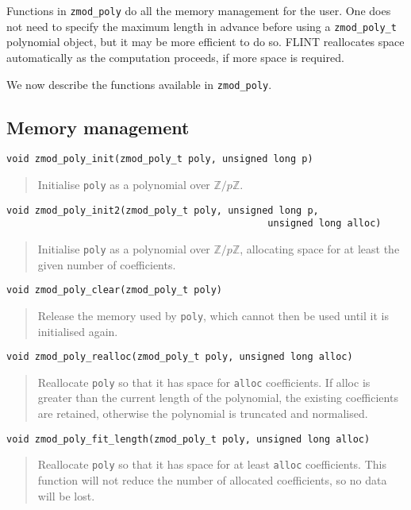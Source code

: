 \documentclass[a4paper,10pt]{article}
\newcommand{\Z}{\mathbb{Z}}
\newcommand{\code}{\lstinline}
\begin{document}
Functions in \code{zmod_poly} do all the memory management for the user. One does not need to specify the maximum length in advance before using a \code{zmod_poly_t} polynomial object, but it may be more efficient to do so. FLINT reallocates space automatically as the computation proceeds, if more space is required. 

We now describe the functions available in \code{zmod_poly}.

\subsection{Memory management}

\begin{lstlisting}
void zmod_poly_init(zmod_poly_t poly, unsigned long p)
\end{lstlisting}
\begin{quote}
Initialise \code{poly} as a polynomial over $\Z/p\Z$. 
\end{quote}

\begin{lstlisting}
void zmod_poly_init2(zmod_poly_t poly, unsigned long p, 
                                              unsigned long alloc)
\end{lstlisting}
\begin{quote}
Initialise \code{poly} as a polynomial over $\Z/p\Z$, allocating space for at least the given number of coefficients. 
\end{quote}

\begin{lstlisting}
void zmod_poly_clear(zmod_poly_t poly)
\end{lstlisting}
\begin{quote}
Release the memory used by \code{poly}, which cannot then be used until it is initialised again.
\end{quote}

\begin{lstlisting}
void zmod_poly_realloc(zmod_poly_t poly, unsigned long alloc)
\end{lstlisting}
\begin{quote}
Reallocate \code{poly} so that it has space for \code{alloc} coefficients. If alloc is greater than the current length of the polynomial, the existing coefficients are retained, otherwise the polynomial is truncated and normalised.
\end{quote}

\begin{lstlisting}
void zmod_poly_fit_length(zmod_poly_t poly, unsigned long alloc)
\end{lstlisting}
\begin{quote}
Reallocate \code{poly} so that it has space for at least \code{alloc} coefficients. This function will not reduce the number of allocated coefficients, so no data will be lost.
\end{quote}
\end{document}
